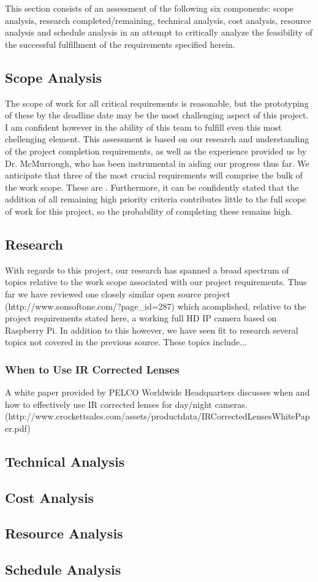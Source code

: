 This section consists of an assessment of the following six components: scope analysis, research completed/remaining, technical analysis, cost analysis, resource analysis and schedule analysis in an attempt to critically analyze the feasibility of the successful fulfillment of the requirements specified herein.
\subsection{Scope Analysis}
The scope of work for all critical requirements is reasonable, but the prototyping of these by the deadline date may be the most challenging aspect of this project. I am confident however in the ability of this team to fulfill even this most chellenging element. This assessment is based on our research and understanding of the project completion requirements, as well as the experience provided us by Dr. McMurrough, who has been instrumental in aiding our progress thus far. We anticipate that three of the most crucial requirements will comprise the bulk of the work scope. These are{ }. Furthermore, it can be confidently stated that the addition of all remaining high priority criteria contributes little to the full scope of work for this project, so the probability of completing these remains high.
\subsection{Research}
With regards to this project, our research has spanned a broad spectrum of topics relative to the work scope associated with our project requirements. Thus far we have reviewed one closely similar open source project (http://www.sonsoftone.com/?page_id=287) which acomplished, relative to the project requirements stated here, a working full HD IP camera based on Raspberry Pi. In addition to this however, we have seen fit to research several topics not covered in the previous source. These topics include...
\subsubsection{When to Use IR Corrected Lenses}
A white paper provided by PELCO Worldwide Headquarters discusses when and how to effectively use IR corrected lenses for day/night cameras. (http://www.crockettsales.com/assets/productdata/IRCorrectedLensesWhitePaper.pdf)
\subsubsection{}
\subsection{Technical Analysis}

\subsection{Cost Analysis}

\subsection{Resource Analysis}

\subsection{Schedule Analysis}
